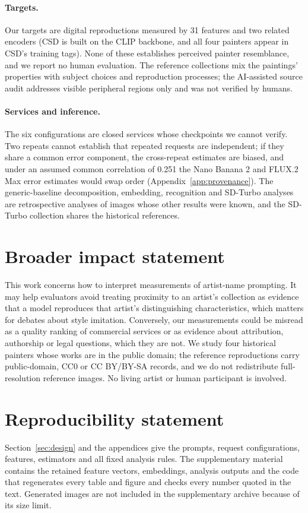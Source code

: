 \documentclass[10pt]{article}
\begin{document}
\paragraph{Targets.} Our targets are digital reproductions measured by 31 features
and two related encoders (CSD is built on the CLIP backbone, and all four painters
appear in CSD's training tags). None of these establishes perceived painter
resemblance, and we report no human evaluation. The reference collections mix the
paintings' properties with subject choices and reproduction processes; the
AI-assisted source audit addresses visible peripheral regions only and was not
verified by humans.

\paragraph{Services and inference.} The six configurations are closed services whose
checkpoints we cannot verify. Two repeats cannot establish that repeated requests
are independent; if they share a common error component, the cross-repeat estimates
are biased, and under an assumed common correlation of 0.251 the Nano Banana 2 and
FLUX.2 Max error estimates would swap order (Appendix~\ref{app:provenance}). The
generic-baseline decomposition, embedding, recognition and SD-Turbo analyses are
retrospective analyses of images whose other results were known, and the SD-Turbo
collection shares the historical references.

\section*{Broader impact statement}
This work concerns how to interpret measurements of artist-name prompting. It may
help evaluators avoid treating proximity to an artist's collection as evidence that a
model reproduces that artist's distinguishing characteristics, which matters for
debates about style imitation. Conversely, our measurements could be misread as a
quality ranking of commercial services or as evidence about attribution, authorship
or legal questions, which they are not. We study four historical painters whose
works are in the public domain; the reference reproductions carry public-domain, CC0
or CC BY/BY-SA records, and we do not redistribute full-resolution reference images.
No living artist or human participant is involved.

\section*{Reproducibility statement}
Section~\ref{sec:design} and the appendices give the prompts, request
configurations, features, estimators and all fixed analysis rules. The supplementary
material contains the retained feature vectors, embeddings, analysis outputs and the
code that regenerates every table and figure and checks every number quoted in the
text. Generated images are not included in the supplementary archive because of its
size limit.




\clearpage
\appendix

\end{document}
